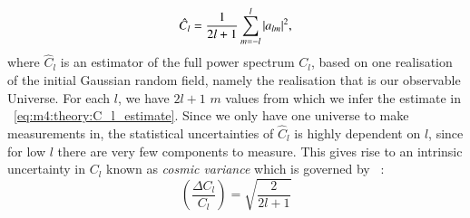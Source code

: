         \begin{equation}\label{eq:m4:theory:C_l_estimate}
            \hat{C}_l = \frac{1}{2l+1}\sum_{m=-l}^l\abs{a_{lm}}^2,
        \end{equation}
        where $\hat{C}_l$ is an estimator of the full power spectrum $C_l$, based on one realisation of the initial Gaussian random field, namely the realisation that is our observable Universe. For each $l$, we have $2l+1$ $m$ values from which we infer the estimate in ~\cref{eq:m4:theory:C_l_estimate}. Since we only have one universe to make measurements in, the statistical uncertainties of $\hat{C}_l$ is highly dependent on $l$, since for low $l$ there are very few components to measure. This gives rise to an intrinsic uncertainty in $C_l$ known as \textit{cosmic variance} which is governed by ~\cite{dodelson2020modern}:
        \begin{equation}\label{eq:m4:theory:cosmic_variance}
            \left(\frac{\Delta C_l}{C_l}\right) = \sqrt{\frac{2}{2l+1}}
        \end{equation}

